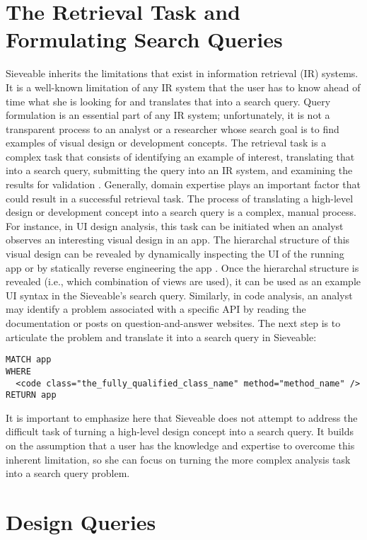 \section{The Retrieval Task and Formulating Search Queries}
Sieveable inherits the limitations that exist in information retrieval (IR) systems.
It is a well-known limitation of any IR system that the user has to know ahead of time what she is looking for and translates that into a search query.
Query formulation is an essential part of any IR system; unfortunately, it is not a transparent process to an analyst or a researcher whose search goal is to find examples of visual design or development concepts.
The retrieval task is a complex task that consists of identifying an example of interest, translating that into a search query, submitting the query into an IR system, and examining the results for validation \cite{jones1997readings}.
Generally, domain expertise plays an important factor that could result in a successful retrieval task.
The process of translating a high-level design or development concept into a search query is a complex, manual process.
For instance, in UI design analysis, this task can be initiated when an analyst observes an interesting visual design in an app.
The hierarchal structure of this visual design can be revealed by dynamically inspecting the UI of the running app \cite{hierarchy_viewer} or by statically reverse engineering the app \cite{apktool}.
Once the hierarchal structure is revealed (i.e., which combination of views are used), it can be used as an example UI syntax in the Sieveable's search query.
Similarly, in code analysis, an analyst may identify a problem associated with a specific API by reading the documentation or posts on question-and-answer websites.
The next step is to articulate the problem and translate it into a search query in Sieveable:
\begin{verbatim}
MATCH app
WHERE
  <code class="the_fully_qualified_class_name" method="method_name" />
RETURN app
\end{verbatim}
It is important to emphasize here that Sieveable does not attempt to address the difficult task of turning a high-level design concept into a search query.
It builds on the assumption that a user has the knowledge and expertise to overcome this inherent limitation, so she can focus on turning the more complex analysis task into a search query problem.

\section{Design Queries}
